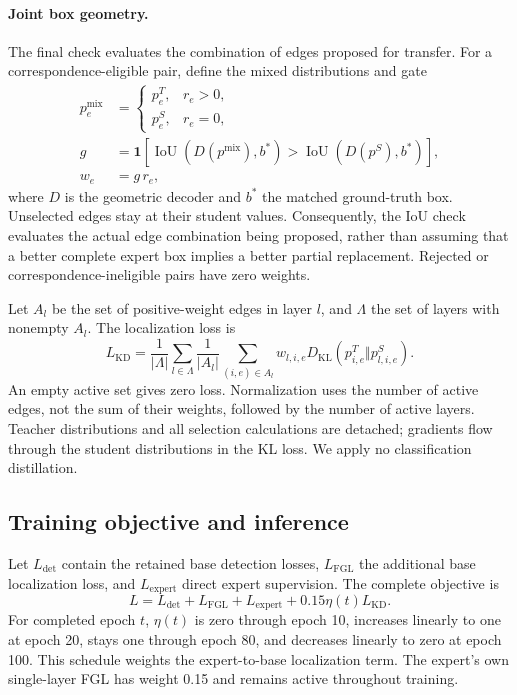 \paragraph{Joint box geometry.}
The final check evaluates the combination of edges proposed for transfer. For a correspondence-eligible pair, define the mixed distributions and gate
\begin{equation}
\begin{aligned}
p^{\mathrm{mix}}_e&=\begin{cases}
p^T_e,&r_e>0,\\
p^S_e,&r_e=0,
\end{cases}\\
g&=\mathbf{1}\!\left[
\operatorname{IoU}(D(p^{\mathrm{mix}}),b^*)>
\operatorname{IoU}(D(p^S),b^*)\right],\\
w_e&=g\,r_e ,
\end{aligned}
\label{eq:mixed}
\end{equation}
where $D$ is the geometric decoder and $b^*$ the matched ground-truth box. Unselected edges stay at their student values. Consequently, the IoU check evaluates the actual edge combination being proposed, rather than assuming that a better complete expert box implies a better partial replacement. Rejected or correspondence-ineligible pairs have zero weights.

Let $A_l$ be the set of positive-weight edges in layer $l$, and $\Lambda$ the set of layers with nonempty $A_l$. The localization loss is
\begin{equation}
L_{\mathrm{KD}}=\frac{1}{|\Lambda|}\sum_{l\in\Lambda}
\frac{1}{|A_l|}\sum_{(i,e)\in A_l}
w_{l,i,e}D_{\mathrm{KL}}\!\left(p^T_{i,e}\Vert p^S_{l,i,e}\right).
\label{eq:kd}
\end{equation}
An empty active set gives zero loss. Normalization uses the number of active edges, not the sum of their weights, followed by the number of active layers. Teacher distributions and all selection calculations are detached; gradients flow through the student distributions in the KL loss. We apply no classification distillation.

\subsection{Training objective and inference}
Let $L_{\mathrm{det}}$ contain the retained base detection losses, $L_{\mathrm{FGL}}$ the additional base localization loss, and $L_{\mathrm{expert}}$ direct expert supervision. The complete objective is
\begin{equation}
L=L_{\mathrm{det}}+L_{\mathrm{FGL}}+L_{\mathrm{expert}}
+0.15\eta(t)L_{\mathrm{KD}}.
\label{eq:objective}
\end{equation}
For completed epoch $t$, $\eta(t)$ is zero through epoch 10, increases linearly to one at epoch 20, stays one through epoch 80, and decreases linearly to zero at epoch 100. This schedule weights the expert-to-base localization term. The expert's own single-layer FGL has weight 0.15 and remains active throughout training.

